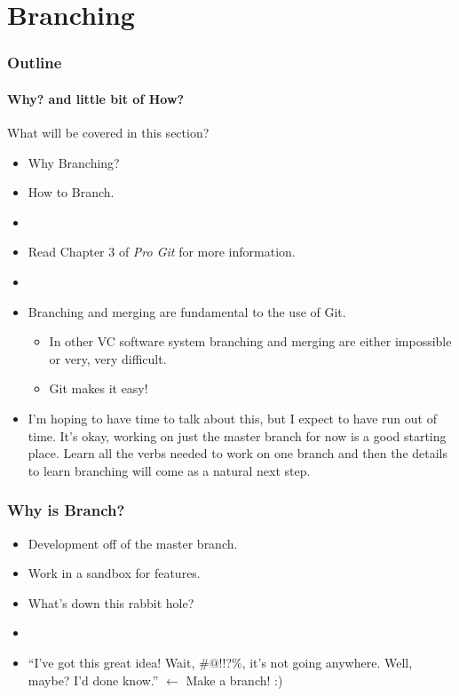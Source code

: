 \section{Branching}

\begin{frame}[t]
  \frametitle{Outline}
  \framesubtitle{Why? and little bit of How?}
\end{frame}

\begin{frame}[t]{What will be covered in this section?}
  \begin{itemize}
    \item Why Branching?
    \item How to Branch.
    \item[]
    \item Read Chapter 3 of {\it Pro Git} for more information.
    \item[]
    \item Branching and merging are fundamental to the use of Git.  
      \begin{itemize}
        \item In other VC software system branching and merging are either
          impossible or very, very difficult.
        \item Git makes it easy!
      \end{itemize}

    \item I'm hoping to have time to talk about this, but I expect to have run
      out of time.  It's okay, working on just the master branch for now is a
      good starting place.  Learn all the verbs needed to work on one branch and
      then the details to learn branching will come as a natural next step.
  \end{itemize}
\end{frame}

\begin{frame}[t]
  \frametitle{Why is Branch?}
  \begin{itemize}
    \item Development off of the master branch.
    \item Work in a sandbox for features.
    \item What's down this rabbit hole?
    \item[]
    \item ``I've got this great idea!  Wait, \#$@$!!?\%, it's not going
      anywhere.  Well, maybe?  I'd done know.'' $\leftarrow$ Make a branch! :)
  \end{itemize}
\end{frame}

